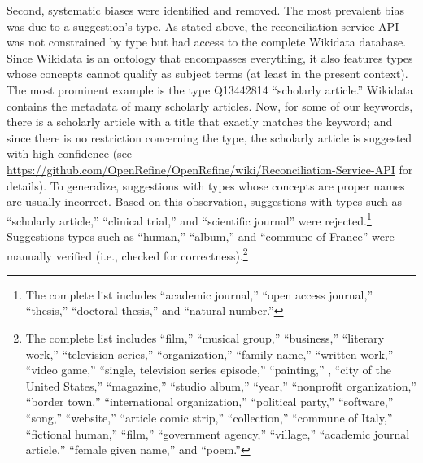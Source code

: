 Second, systematic biases were identified and removed. The most
prevalent bias was due to a suggestion's type. As stated above, the
reconciliation service API was not constrained by type but had access to
the complete Wikidata database. Since Wikidata is an ontology that
encompasses everything, it also features types whose concepts cannot
qualify as subject terms (at least in the present context). The most
prominent example is the type Q13442814 ``scholarly article.'' Wikidata
contains the metadata of many scholarly articles. Now, for some of our
keywords, there is a scholarly article with a title that exactly matches
the keyword; and since there is no restriction concerning the type, the
scholarly article is suggested with high confidence (see
\url{https://github.com/OpenRefine/OpenRefine/wiki/Reconciliation-Service-API}
for details). To generalize, suggestions with types whose concepts are
proper names are usually incorrect. Based on this observation,
suggestions with types such as ``scholarly article,'' ``clinical
trial,'' and ``scientific journal'' were rejected.\footnote{The complete
  list includes ``academic journal,'' ``open access journal,''
  ``thesis,'' ``doctoral thesis,'' and ``natural number.''} Suggestions
types such as ``human,'' ``album,'' and ``commune of France'' were
manually verified (i.e., checked for correctness).\footnote{The complete
  list includes ``film,'' ``musical group,'' ``business,'' ``literary
  work,'' ``television series,'' ``organization,'' ``family name,''
  ``written work,'' ``video game,'' ``single, television series
  episode,'' ``painting,'' , ``city of the United States,''
  ``magazine,'' ``studio album,'' ``year,'' ``nonprofit organization,''
  ``border town,'' ``international organization,'' ``political party,''
  ``software,'' ``song,'' ``website,'' ``article comic strip,''
  ``collection,'' ``commune of Italy,'' ``fictional human,'' ``film,''
  ``government agency,'' ``village,'' ``academic journal article,''
  ``female given name,'' and ``poem.''}


